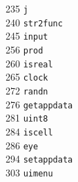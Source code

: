\begin{footnotesize}
\begin{multicols}{3}
\vspace{-.153cm} 235   \hspace{.2cm} {\tt j                   }     \\ %
\vspace{-.153cm} 240   \hspace{.2cm} {\tt str2func            }     \\ %
\vspace{-.153cm} 245   \hspace{.2cm} {\tt input               }     \\ %
\vspace{-.153cm} 256   \hspace{.2cm} {\tt prod                }     \\ %
\vspace{-.153cm} 260   \hspace{.2cm} {\tt isreal              }     \\ %
\vspace{-.153cm} 265   \hspace{.2cm} {\tt clock               }     \\ %
\vspace{-.153cm} 272   \hspace{.2cm} {\tt randn               }     \\ %
\vspace{-.153cm} 276   \hspace{.2cm} {\tt getappdata          }     \\ %
\vspace{-.153cm} 281   \hspace{.2cm} {\tt uint8               }     \\ %
\vspace{-.153cm} 284   \hspace{.2cm} {\tt iscell              }     \\ %
\vspace{-.153cm} 286   \hspace{.2cm} {\tt eye                 }     \\ %
\vspace{-.153cm} 294   \hspace{.2cm} {\tt setappdata          }     \\ %
\vspace{-.153cm} 303   \hspace{.2cm} {\tt uimenu              }     \\ %

\end{multicols}
\end{footnotesize}
